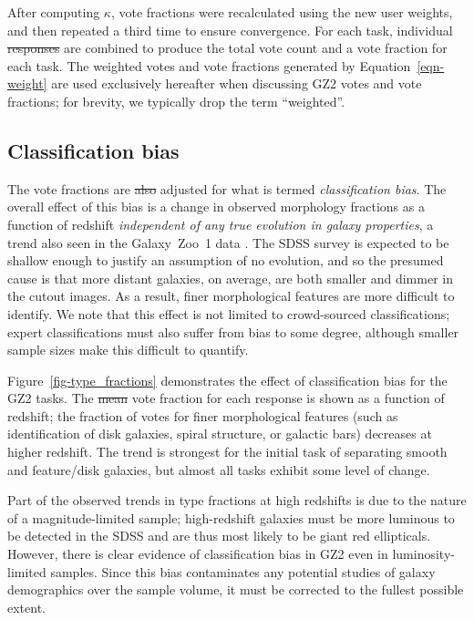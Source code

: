\documentclass[useAMS,usenatbib]{mn2e}
\providecommand{\DIFaddtex}[1]{{\protect\color{blue}\uwave{#1}}} %
\providecommand{\DIFdeltex}[1]{{\protect\color{red}\sout{#1}}}                      %
\providecommand{\DIFaddbegin}{} %
\providecommand{\DIFaddend}{} %
\providecommand{\DIFdelbegin}{} %
\providecommand{\DIFdelend}{} %
\providecommand{\DIFadd}[1]{\texorpdfstring{\DIFaddtex{#1}}{#1}} %
\providecommand{\DIFdel}[1]{\texorpdfstring{\DIFdeltex{#1}}{}} %
\begin{document}
After computing $\kappa$, vote fractions were recalculated using the new user weights, and then repeated a third time to ensure convergence. For each task, individual \DIFdelbegin \DIFdel{responses }\DIFdelend \DIFaddbegin \DIFadd{classifications }\DIFaddend are combined to produce the total vote count and a vote fraction for each task. The weighted votes and vote fractions generated by Equation~\ref{eqn-weight} are used exclusively hereafter when discussing GZ2 votes and vote fractions; for brevity, we typically drop the term ``weighted''. 

\subsection{Classification bias}\label{ssec-classificationbias}

The vote fractions are \DIFdelbegin \DIFdel{also }\DIFdelend adjusted for what is termed {\it classification bias}. The overall effect of this bias is a change in observed morphology fractions as a function of redshift {\em independent of any true evolution in galaxy properties}, a trend also seen in the Galaxy~Zoo~1 data \citep{bam09}. The SDSS survey is expected to be shallow enough to justify an assumption of no evolution, and so the presumed cause is that more distant galaxies, on average, are both smaller and dimmer in the cutout images. As a result, finer morphological features are more difficult to identify. We note that this effect is not limited to crowd-sourced classifications; expert classifications must also suffer from bias to some degree, although smaller sample sizes make this difficult to quantify. 

Figure~\ref{fig-type_fractions} demonstrates the effect of classification bias for the GZ2 tasks. The \DIFdelbegin \DIFdel{mean }\DIFdelend \DIFaddbegin \DIFadd{average }\DIFaddend vote fraction for each response is shown as a function of redshift; the fraction of votes for finer morphological features (such as identification of disk galaxies, spiral structure, or galactic bars) decreases at higher redshift. The trend is strongest for the initial task of separating smooth and feature/disk galaxies, but almost all tasks exhibit some level of change. 

Part of the observed trends in type fractions at high redshifts is due to the nature of a magnitude-limited sample; high-redshift galaxies must be more luminous to be detected in the SDSS and are thus most likely to be giant red ellipticals. However, there is clear evidence of classification bias in GZ2 even in luminosity-limited samples. Since this bias contaminates any potential studies of galaxy demographics over the sample volume, it must be corrected to the fullest possible extent. 
\end{document}
